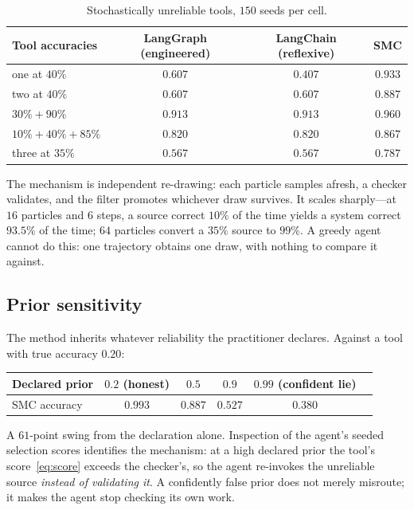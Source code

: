 \documentclass[11pt,a4paper]{article}
\begin{document}
\begin{table}[h]
\centering
\begin{tabular}{@{}lccc@{}}
\toprule
\textbf{Tool accuracies} & \textbf{LangGraph (engineered)} & \textbf{LangChain (reflexive)} & \textbf{SMC} \\
\midrule
one at $40\%$                 & $0.607$ & $0.407$ & $\bm{0.933}$ \\
two at $40\%$                 & $0.607$ & $0.607$ & $\bm{0.887}$ \\
$30\% + 90\%$                 & $0.913$ & $0.913$ & $\bm{0.960}$ \\
$10\% + 40\% + 85\%$          & $0.820$ & $0.820$ & $\bm{0.867}$ \\
three at $35\%$               & $0.567$ & $0.567$ & $\bm{0.787}$ \\
\bottomrule
\end{tabular}
\caption{Stochastically unreliable tools, $150$ seeds per cell.}
\end{table}

The mechanism is independent re-drawing: each particle samples afresh, a
checker validates, and the filter promotes whichever draw survives. It scales
sharply---at $16$ particles and $6$ steps, a source correct $10\%$ of the time
yields a system correct $93.5\%$ of the time; $64$ particles convert a $35\%$
source to $99\%$. A greedy agent cannot do this: one trajectory obtains one
draw, with nothing to compare it against.

\subsection{Prior sensitivity}

The method inherits whatever reliability the practitioner declares. Against a
tool with true accuracy $0.20$:

\begin{center}
\begin{tabular}{@{}lccccc@{}}
\toprule
Declared prior & $0.2$ (honest) & $0.5$ & $0.9$ & $0.99$ (confident lie) \\
\midrule
SMC accuracy & $\bm{0.993}$ & $0.887$ & $0.527$ & $0.380$ \\
\bottomrule
\end{tabular}
\end{center}

A $61$-point swing from the declaration alone. Inspection of the agent's seeded
selection scores identifies the mechanism: at a high declared prior the tool's
score~\eqref{eq:score} exceeds the checker's, so the agent re-invokes the
unreliable source \emph{instead of validating it}. A confidently false prior
does not merely misroute; it makes the agent stop checking its own work.
\end{document}

